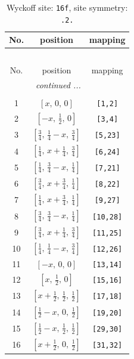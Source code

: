 \documentclass[fleqn,8pt]{jsarticle}
\begin{document}
\begin{longtable}{ccc}
\caption{Wyckoff site: {\tt 16f}, site symmetry: {\tt .2.}}
 \\
 \hline \hline
No. & position & mapping \\ \hline \endfirsthead

\multicolumn{2}{l}{\tablename\ \thetable{}} \\
 \hline \hline
No. & position & mapping \\ \hline \endhead

 \hline \hline
\multicolumn{2}{r}{\footnotesize\it continued ...} \\ \endfoot

 \hline \hline
\multicolumn{2}{r}{} \\ \endlastfoot

1 & $\left[ x,\, 0,\, 0 \right]$ & {\tt [1,2]} \\ \hline
2 & $\left[ - x,\, \frac{1}{2},\, 0 \right]$ & {\tt [3,4]} \\ \hline
3 & $\left[ \frac{3}{4},\, \frac{1}{4} - x,\, \frac{3}{4} \right]$ & {\tt [5,23]} \\ \hline
4 & $\left[ \frac{1}{4},\, x + \frac{1}{4},\, \frac{3}{4} \right]$ & {\tt [6,24]} \\ \hline
5 & $\left[ \frac{1}{4},\, \frac{3}{4} - x,\, \frac{1}{4} \right]$ & {\tt [7,21]} \\ \hline
6 & $\left[ \frac{3}{4},\, x + \frac{3}{4},\, \frac{1}{4} \right]$ & {\tt [8,22]} \\ \hline
7 & $\left[ \frac{1}{4},\, x + \frac{3}{4},\, \frac{1}{4} \right]$ & {\tt [9,27]} \\ \hline
8 & $\left[ \frac{3}{4},\, \frac{3}{4} - x,\, \frac{1}{4} \right]$ & {\tt [10,28]} \\ \hline
9 & $\left[ \frac{3}{4},\, x + \frac{1}{4},\, \frac{3}{4} \right]$ & {\tt [11,25]} \\ \hline
10 & $\left[ \frac{1}{4},\, \frac{1}{4} - x,\, \frac{3}{4} \right]$ & {\tt [12,26]} \\ \hline
11 & $\left[ - x,\, 0,\, 0 \right]$ & {\tt [13,14]} \\ \hline
12 & $\left[ x,\, \frac{1}{2},\, 0 \right]$ & {\tt [15,16]} \\ \hline
13 & $\left[ x + \frac{1}{2},\, \frac{1}{2},\, \frac{1}{2} \right]$ & {\tt [17,18]} \\ \hline
14 & $\left[ \frac{1}{2} - x,\, 0,\, \frac{1}{2} \right]$ & {\tt [19,20]} \\ \hline
15 & $\left[ \frac{1}{2} - x,\, \frac{1}{2},\, \frac{1}{2} \right]$ & {\tt [29,30]} \\ \hline
16 & $\left[ x + \frac{1}{2},\, 0,\, \frac{1}{2} \right]$ & {\tt [31,32]} \\
\end{longtable}
\end{document}
